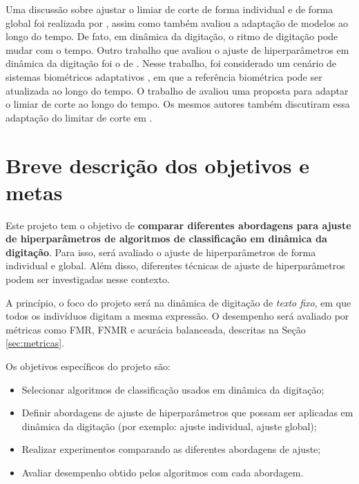 Uma discussão sobre ajustar o limiar de corte de forma individual e de forma global foi realizada por , assim como também avaliou a adaptação de modelos ao longo do tempo. De fato, em dinâmica da digitação, o ritmo de digitação pode mudar com o tempo. Outro trabalho que avaliou o ajuste de hiperparâmetros em dinâmica da digitação foi o de . Nesse trabalho, foi considerado um cenário de sistemas biométricos adaptativos \cite{Ryu2023Design}, em que a referência biométrica pode ser atualizada ao longo do tempo. O trabalho de  avaliou uma proposta para adaptar o limiar de corte ao longo do tempo. Os mesmos autores também discutiram essa adaptação do limitar de corte em \cite{Mhenni2019DoubleSerial}.


\section{Breve descrição dos objetivos e metas}
\label{sec:objetivos}

Este projeto tem o objetivo de \textbf{comparar diferentes abordagens para ajuste de hiperparâmetros de algoritmos de classificação em dinâmica da digitação}. Para isso, será avaliado o ajuste de hiperparâmetros de forma individual e global. Além disso, diferentes técnicas de ajuste de hiperparâmetros podem ser investigadas nesse contexto.

A princípio, o foco do projeto será na dinâmica de digitação de \textit{texto fixo}, em que todos os indivíduos digitam a mesma expressão. O desempenho será avaliado por métricas como FMR, FNMR e acurácia balanceada, descritas na Seção \ref{sec:metricas}.

Os objetivos específicos do projeto são:

\begin{itemize}
    \item Selecionar algoritmos de classificação usados em dinâmica da digitação;
    \item Definir abordagens de ajuste de hiperparâmetros que possam ser aplicadas em dinâmica da digitação (por exemplo: ajuste individual, ajuste global);
    \item Realizar experimentos comparando as diferentes abordagens de ajuste;
    \item Avaliar desempenho obtido pelos algoritmos com cada abordagem.
\end{itemize}


